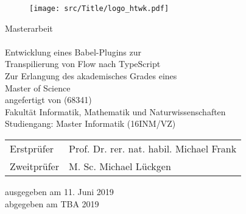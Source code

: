 \makeatletter
\begin{titlepage}
  \vspace{1cm}

  \begin{figure}[h!]
    \centering
    \texttt{[image: src/Title/logo\_htwk.pdf]}
  \end{figure}

  \begin{center}
    \vspace{1cm}

    \begin{onehalfspacing}
      {\Large Masterarbeit} \\[8ex]
      {\huge\textbf{\@title}} \\[5ex]
      {\Large\libertineSB Entwicklung eines Babel-Plugins zur\\Transpilierung von Flow nach TypeScript} \\[8ex]
      \large
      Zur Erlangung des akademisches Grades eines \\
      Master of Science \\[5ex]
      \vfill
      {\libertineSB angefertigt von \@author{ }(68341)}\\[5ex]
      \vfill
      Fakultät Informatik, Mathematik und Naturwissenschaften\\
      Studiengang: Master Informatik (16INM/VZ)\\[5ex]
      \vfill
      \begin{tabular}{ll}
        Erstprüfer & Prof. Dr. rer. nat. habil. Michael Frank \\
        Zweitprüfer & M. Sc. Michael Lückgen \\
      \end{tabular}
      \vspace{5ex}
      \vfill
      ausgegeben am 11. Juni 2019 \\
      abgegeben am TBA 2019
    \end{onehalfspacing}
  \end{center}
\end{titlepage}
\makeatother
